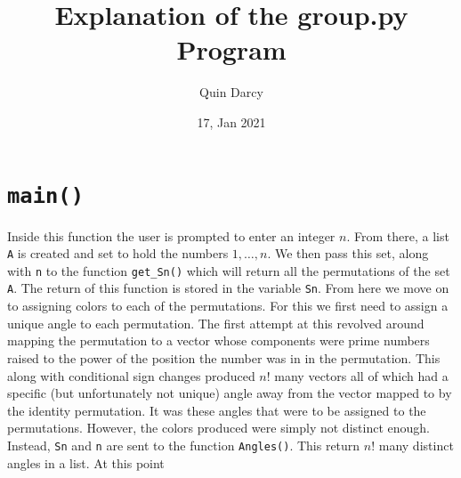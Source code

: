 \documentclass[leqno]{article}
\theoremstyle{definition}
\theoremstyle{remark}
\begin{document}
\title{Explanation of the group.py Program}
\author{Quin Darcy}
\date{17, Jan 2021}
\maketitle
    
    \section{\texttt{main()}}
    Inside this function the user is prompted to enter an integer $n$. From there, a list \texttt{A} is created and set to hold the numbers $1,\dots,n$. We then pass this set, along with \texttt{n} to the function \texttt{get\_Sn()} which will return all the permutations of the set \texttt{A}. The return of this function is stored in the variable \texttt{Sn}. From here we move on to assigning colors to each of the permutations. For this we first need to assign a unique angle to each permutation. The first attempt at this revolved around mapping the permutation to a vector whose components were prime numbers raised to the power of the position the number was in in the permutation. This along with conditional sign changes produced $n!$ many vectors all of which had a specific (but unfortunately not unique) angle away from the vector mapped to by the identity permutation. It was these angles that were to be assigned to the permutations. However, the colors produced were simply not distinct enough. Instead, \texttt{Sn} and \texttt{n} are sent to the function \texttt{Angles()}. This return $n!$ many distinct angles in a list. At this point 
    
\end{document}
